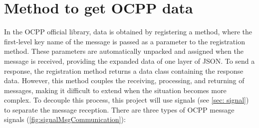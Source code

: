 \documentclass[
	english,
	ruledheaders=section,%
	class=report,%
	thesis={type=Report},%
	accentcolor=9c,%
	custommargins=true,%
	marginpar=false,%
	parskip=half-,%
	fontsize=11pt,%
	logofile={img/tuda_logo.pdf}, %
]{tudapub}
\begin{document}

\section{Method to get OCPP data}
\label{sec:ocppSendReceive}

In the \ac{OCPP} official library, data is obtained by registering a method, where the first-level key name of the message is passed as a parameter to the registration method. These parameters are automatically unpacked and assigned when the message is received, providing the expanded data of one layer of JSON. To send a response, the registration method returns a data class containing the response data.
However, this method couples the receiving, processing, and returning of messages, making it difficult to extend when the situation becomes more complex. To decouple this process, this project will use signals (see \autoref{sec: signal}) to separate the message reception. There are three types of \ac{OCPP} message signals (\autoref{fig:signalMsgCommunication}):
\end{document}
